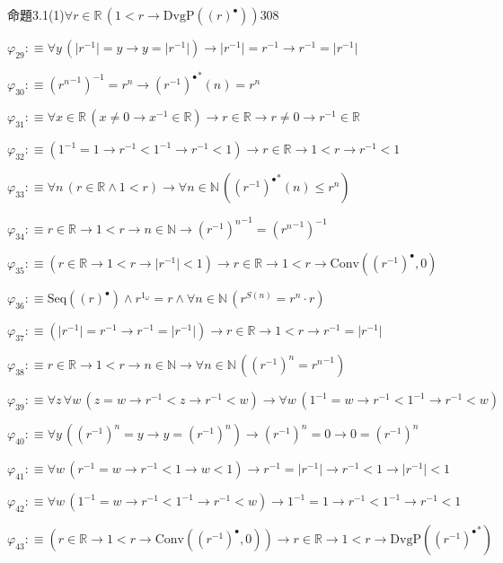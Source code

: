 \begin{fullproof}{命題3.1(1)}{$\forall r \in \mathbb{R}\,(1 < r \to \mathrm{DvgP}({(r)^{\bullet}}))$}{308}
\begin{abbrevlist}
\item $\varphi_{29} :\equiv \forall y\,(\lvert r^{-1} \rvert = y \to y = \lvert r^{-1} \rvert) \to \lvert r^{-1} \rvert = r^{-1} \to r^{-1} = \lvert r^{-1} \rvert$
\item $\varphi_{30} :\equiv ({{r}^{n}}^{-1})^{-1} = {{r}^{n}} \to {(r^{-1})^{\bullet}}^{\ast}(n) = {{r}^{n}}$
\item $\varphi_{31} :\equiv \forall x \in \mathbb{R}\,(x \neq 0 \to x^{-1} \in \mathbb{R}) \to r \in \mathbb{R} \to r \neq 0 \to r^{-1} \in \mathbb{R}$
\item $\varphi_{32} :\equiv (1^{-1} = 1 \to r^{-1} < 1^{-1} \to r^{-1} < 1) \to r \in \mathbb{R} \to 1 < r \to r^{-1} < 1$
\item $\varphi_{33} :\equiv \forall n\,(r \in \mathbb{R} \land 1 < r) \to \forall n \in \mathbb{N}\,({(r^{-1})^{\bullet}}^{\ast}(n) \leq {{r}^{n}})$
\item $\varphi_{34} :\equiv r \in \mathbb{R} \to 1 < r \to n \in \mathbb{N} \to {{(r^{-1})}^{n}}^{-1} = ({{r}^{n}}^{-1})^{-1}$
\item $\varphi_{35} :\equiv (r \in \mathbb{R} \to 1 < r \to \lvert r^{-1} \rvert < 1) \to r \in \mathbb{R} \to 1 < r \to \mathrm{Conv}({(r^{-1})^{\bullet}},0)$
\item $\varphi_{36} :\equiv \mathrm{Seq}({(r)^{\bullet}}) \land {{r}^{1_{\omega}}} = r \land \forall n \in \mathbb{N}\,({{r}^{S(n)}} = {{r}^{n}} \cdot r)$
\item $\varphi_{37} :\equiv (\lvert r^{-1} \rvert = r^{-1} \to r^{-1} = \lvert r^{-1} \rvert) \to r \in \mathbb{R} \to 1 < r \to r^{-1} = \lvert r^{-1} \rvert$
\item $\varphi_{38} :\equiv r \in \mathbb{R} \to 1 < r \to n \in \mathbb{N} \to \forall n \in \mathbb{N}\,({{(r^{-1})}^{n}} = {{r}^{n}}^{-1})$
\item $\varphi_{39} :\equiv \forall z\,\forall w\,(z = w \to r^{-1} < z \to r^{-1} < w) \to \forall w\,(1^{-1} = w \to r^{-1} < 1^{-1} \to r^{-1} < w)$
\item $\varphi_{40} :\equiv \forall y\,({{(r^{-1})}^{n}} = y \to y = {{(r^{-1})}^{n}}) \to {{(r^{-1})}^{n}} = 0 \to 0 = {{(r^{-1})}^{n}}$
\item $\varphi_{41} :\equiv \forall w\,(r^{-1} = w \to r^{-1} < 1 \to w < 1) \to r^{-1} = \lvert r^{-1} \rvert \to r^{-1} < 1 \to \lvert r^{-1} \rvert < 1$
\item $\varphi_{42} :\equiv \forall w\,(1^{-1} = w \to r^{-1} < 1^{-1} \to r^{-1} < w) \to 1^{-1} = 1 \to r^{-1} < 1^{-1} \to r^{-1} < 1$
\item $\varphi_{43} :\equiv (r \in \mathbb{R} \to 1 < r \to \mathrm{Conv}({(r^{-1})^{\bullet}},0)) \to r \in \mathbb{R} \to 1 < r \to \mathrm{DvgP}({(r^{-1})^{\bullet}}^{\ast})$

\end{abbrevlist}
\end{fullproof}
